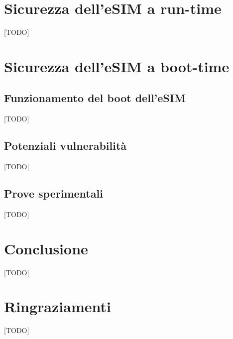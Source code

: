 \documentclass[10pt, twoside, openany]{book}
\begin{document}
\chapter{Sicurezza dell'eSIM a run-time}
[TODO]

\chapter{Sicurezza dell'eSIM a boot-time}
\section{Funzionamento del boot dell'eSIM}
[TODO]

\section{Potenziali vulnerabilità}
[TODO]

\section{Prove sperimentali}
[TODO]

\chapter{Conclusione}
[TODO]



\chapter*{Ringraziamenti}
[TODO]
\end{document}
